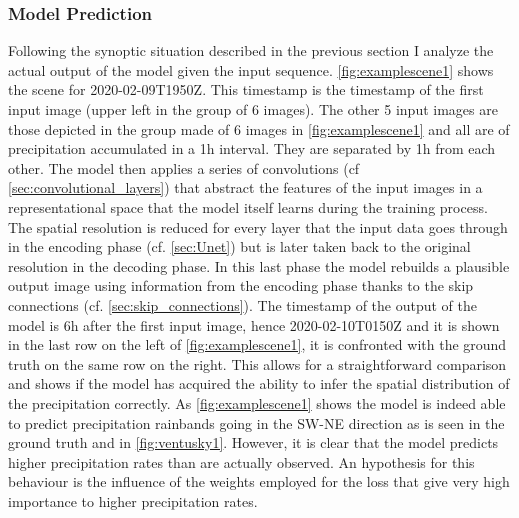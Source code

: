 \subsubsection{Model Prediction}
Following the synoptic situation described in the previous section I analyze the actual output of the model given the input sequence. \cref{fig:examplescene1} shows the scene for 2020-02-09T1950Z. This timestamp is the timestamp of the first input image (upper left in the group of 6 images). The other 5 input images are those depicted in the group made of 6 images in \cref{fig:examplescene1} and all are of precipitation accumulated in a 1h interval. They are separated by 1h from each other. The model then applies a series of convolutions (cf \cref{sec:convolutional_layers}) that abstract the features of the input images in a representational space that the model itself learns during the training process. The spatial resolution is reduced for every layer that the input data goes through in the encoding phase (cf. \cref{sec:Unet}) but is later taken back to the original resolution in the decoding phase. In this last phase the model rebuilds a plausible output image using information from the encoding phase thanks to the skip connections (cf. \cref{sec:skip_connections}). The timestamp of the output of the model is 6h after the first input image, hence 2020-02-10T0150Z and it is shown in the last row on the left of \cref{fig:examplescene1}, it is confronted with the ground truth on the same row on the right. This allows for a straightforward comparison and shows if the model has acquired the ability to infer the spatial distribution of the precipitation correctly. As \cref{fig:examplescene1} shows the model is indeed able to predict precipitation rainbands going in the SW-NE direction as is seen in the ground truth and in \cref{fig:ventusky1}. However, it is clear that the model predicts higher precipitation rates than are actually observed. An hypothesis for this behaviour is the influence of the weights employed for the loss that give very high importance to higher precipitation rates.
